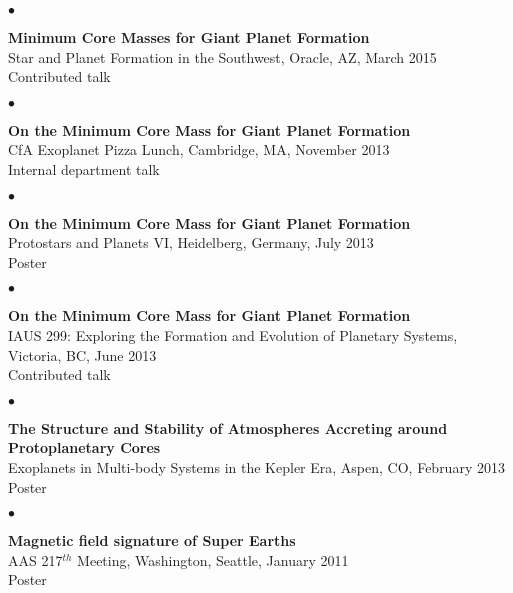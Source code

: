 \documentclass[margin,line]{res}
\newenvironment{list2}{
  \begin{list}{$\bullet$}{%
      \setlength{\itemsep}{0in}
      \setlength{\parsep}{0in} \setlength{\parskip}{0in}
      \setlength{\topsep}{0in} \setlength{\partopsep}{0in} 
      \setlength{\leftmargin}{0.2in}}}{\end{list}}
\begin{document}
\begin{resume}
\begin{list2}
\item[] {\bf Minimum Core Masses for Giant Planet Formation} \\
Star and Planet Formation in the Southwest, Oracle, AZ, March 2015  \\
Contributed talk \\
\end{list2}

\begin{list2}
\item[] {\bf On the Minimum Core Mass for Giant Planet Formation} \\
CfA Exoplanet Pizza Lunch, Cambridge, MA, November 2013  \\
Internal department talk \\
\end{list2}

\begin{list2}
\item[] {\bf On the Minimum Core Mass for Giant Planet Formation} \\
Protostars and Planets VI, Heidelberg, Germany, July 2013  \\
Poster \\
\end{list2}

\begin{list2}
\item[] {\bf On the Minimum Core Mass for Giant Planet Formation} \\
IAUS 299: Exploring the Formation and Evolution of Planetary Systems, Victoria, BC, June 2013  \\
Contributed talk \\
\end{list2}

\begin{list2}
\item[] {\bf The Structure and Stability of Atmospheres Accreting around Protoplanetary Cores} \\
Exoplanets in Multi-body Systems in the Kepler Era, Aspen, CO, February 2013 \\
Poster \\
\end{list2}

\begin{list2}
\item[] {\bf Magnetic field signature of Super Earths} \\
AAS 217$^{th}$ Meeting, Washington, Seattle, January 2011  \\
Poster \\
\end{list2}


\end{resume}
\end{document}
